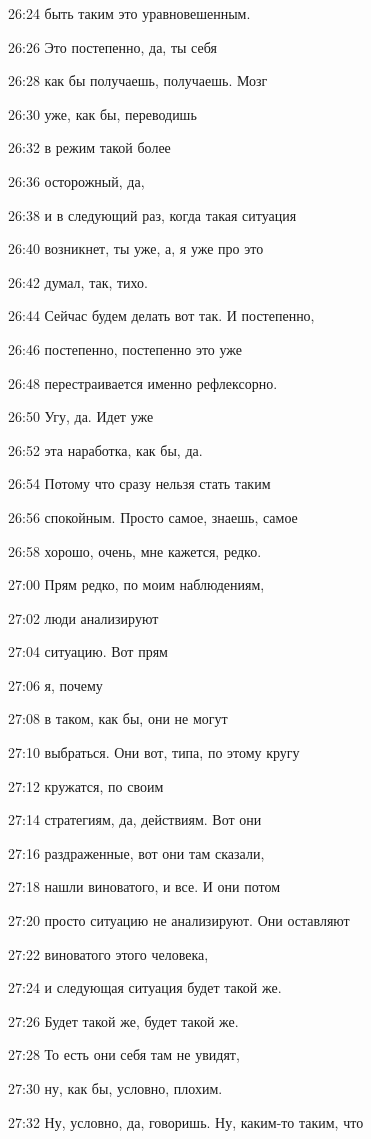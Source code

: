 26:24
быть таким это уравновешенным.

26:26
Это постепенно, да, ты себя

26:28
как бы получаешь, получаешь. Мозг

26:30
уже, как бы, переводишь

26:32
в режим такой более

26:36
осторожный, да,

26:38
и в следующий раз, когда такая ситуация

26:40
возникнет, ты уже, а, я уже про это

26:42
думал, так, тихо.

26:44
Сейчас будем делать вот так. И постепенно,

26:46
постепенно, постепенно это уже

26:48
перестраивается именно рефлексорно.

26:50
Угу, да. Идет уже

26:52
эта наработка, как бы, да.

26:54
Потому что сразу нельзя стать таким

26:56
спокойным. Просто самое, знаешь, самое

26:58
хорошо, очень, мне кажется, редко.

27:00
Прям редко, по моим наблюдениям,

27:02
люди анализируют

27:04
ситуацию. Вот прям

27:06
я, почему

27:08
в таком, как бы, они не могут

27:10
выбраться. Они вот, типа, по этому кругу

27:12
кружатся, по своим

27:14
стратегиям, да, действиям. Вот они

27:16
раздраженные, вот они там сказали,

27:18
нашли виноватого, и все. И они потом

27:20
просто ситуацию не анализируют. Они оставляют

27:22
виноватого этого человека,

27:24
и следующая ситуация будет такой же.

27:26
Будет такой же, будет такой же.

27:28
То есть они себя там не увидят,

27:30
ну, как бы, условно, плохим.

27:32
Ну, условно, да, говоришь. Ну, каким-то таким, что

